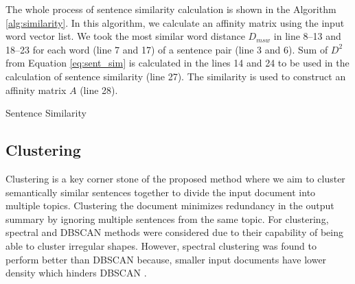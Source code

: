 \documentclass[acmlarge]{acmart}
\begin{document}
The whole process of sentence similarity calculation is shown in the Algorithm \ref{alg:similarity}. In this algorithm, we calculate an affinity matrix using the input word vector list. We took the most similar word distance $D_{msw}$ in line 8--13 and 18--23 for each word (line 7 and 17) of a sentence pair (line 3 and 6). Sum of $D^2$ from Equation \ref{eq:sent_sim} is calculated in the lines 14 and 24 to be used in the calculation of sentence similarity (line 27). The similarity is used to construct an affinity matrix $A$ (line 28).
\begin{algorithm}[]
	\caption{Sentence Similarity}
	\label{alg:similarity}
	\SetAlgoLined
	
\end{algorithm}
\subsection{Clustering}\label{subsec:clustering}
Clustering is a key corner stone of the proposed method where we aim to cluster semantically similar sentences together to divide the input document into multiple topics. Clustering the document minimizes redundancy in the output summary by ignoring multiple sentences from the same topic. For clustering, spectral and DBSCAN methods were considered due to their capability of being able to cluster irregular shapes. However, spectral clustering was found to perform better than DBSCAN because, smaller input documents have lower density which hinders DBSCAN \cite{roychowdhury-etal-2022-spectral-base}.
\end{document}
